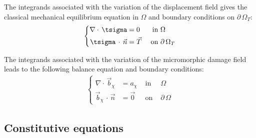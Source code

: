 The integrands associated with the variation of the displacement field gives
the classical mechanical equilibrium equation in $\Omega$ and boundary
conditions on $\partial\,\Omega_{T}$:
\begin{equation}
  \label{eq:micromorphicdamage:mechanical_equilibrium}
  \begin{aligned}
    \left\{
    \begin{aligned}
    \nabla \cdot\,\tsigma &= 0       & \text{ in } & \Omega \\
    \tsigma\,\cdot\,\vec{n}&=\vec{T} & \text{ on } & \partial\,\Omega_{T}
    \end{aligned}
    \right.
  \end{aligned}
\end{equation}

The integrands associated with the variation of the micromorphic damage field
leads to the following balance equation and boundary conditions:
\begin{equation}
  \label{eq:micromorphicdamage:d_chi}
  \begin{aligned}
    \left\{
    \begin{aligned}
    \nabla \cdot\,\vec{b}_{\chi} &= a_{\chi} &\text{ in }& \Omega \\
    \vec{b}_{\chi}\,\cdot\,\vec{n}&=\vec{0} &\text{ on }& \partial\,\Omega
    \end{aligned}
    \right.
  \end{aligned}
\end{equation}

\subsection{Constitutive equations}
\label{sec:micromorphicdamage:constitutive_equations}


